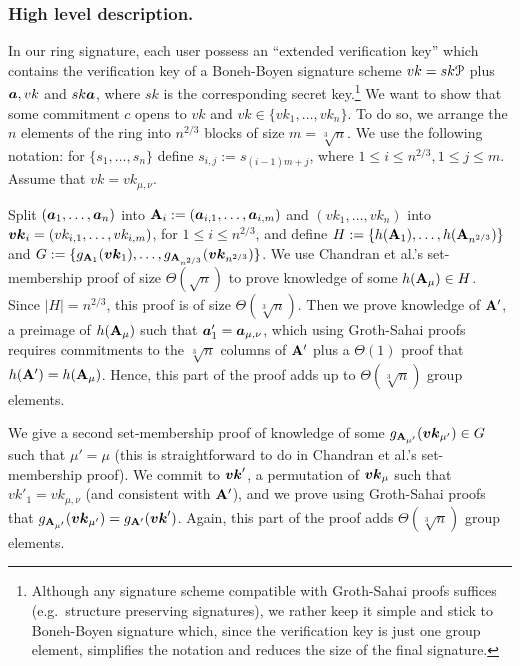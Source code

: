 \subsubsection{High level description.}
In our ring signature, each user possess an ``extended verification key'' which contains the verification key of a Boneh-Boyen signature scheme $vk = sk\mathcal{P}$ plus  ${\boldsymbol{a}},vk$ and $sk{\boldsymbol{a}}$, where $sk$ is the corresponding secret key.\footnote{Although any signature scheme compatible with Groth-Sahai proofs suffices (e.g.~structure preserving signatures), we rather keep it simple and stick to Boneh-Boyen signature which, since the verification key is just one group element, simplifies the notation and reduces the size of the final signature.} We want to show that some commitment $c$ opens to $vk$ and $vk\in\{vk_1,\ldots,vk_n\}$. To do so, we arrange the $n$ elements of the ring into $n^{2/3}$ blocks of size $m=\sqrt[3]{n}$. We use the following notation: for $\{s_1,\ldots, s_n\}$ define $s_{i,j}:=s_{(i-1)m+j}$, where  $1\leq i \leq n^{2/3},1\leq  j \leq m$. Assume that $vk = vk_{\mu,\nu}$.

Split $({\boldsymbol{a}}_{1},\ldots, {\boldsymbol{a}}_{n})$ into $\mathbf{{A}}_i := ({\boldsymbol{a}}_{i,1},\ldots,{\boldsymbol{a}}_{i,m})$ and $(vk_1,\ldots,vk_n)$ into ${\boldsymbol{vk}}_i = (vk_{i,1},\ldots,vk_{i,m})$,  for $1\leq i\leq n^{2/3}$, and define $H\allowbreak:=\{h(\mathbf{{A}}_1),\allowbreak\ldots,\allowbreak h(\mathbf{{A}}_{n^{2/3}})\}$ and $G := \{g_{\mathbf{{A}}_1}({\boldsymbol{vk}}_1),\ldots,g_{\mathbf{{A}}_{n^{2/3}}}({\boldsymbol{vk}}_{n^{2/3}})\}$.  
We use Chandran et al.'s set-membership proof of size $\Theta(\sqrt{n})$ to prove knowledge of some $h(\mathbf{{A}}_\mu)\in H$. Since $|H|=n^{2/3}$, this proof is of size $\Theta(\sqrt[3]{n})$. Then we prove knowledge of $\mathbf{{A}}'$, a preimage of $h(\mathbf{{A}}_\mu)$ such that ${\boldsymbol{a}}'_1 = {\boldsymbol{a}}_{\mu,\nu}$, which using Groth-Sahai proofs requires commitments to the $\sqrt[3]{n}$ columns of $\mathbf{{A}}'$ plus a $\Theta(1)$ proof that $h(\mathbf{{A}}')=h(\mathbf{{A}}_\mu)$. Hence, this part of the proof adds up to $\Theta(\sqrt[3]{n})$ group elements.

We give a second set-membership proof of knowledge of some
$g_{\mathbf{{A}}_{\mu'}}({\boldsymbol{vk}}_{\mu'})\in G$ such that $\mu'=\mu$ (this is straightforward to do in Chandran et al.'s set-membership proof).
We commit to ${\boldsymbol{vk}}'$, a permutation of ${\boldsymbol{vk}}_\mu$ such that $vk'_1=vk_{\mu,\nu}$ (and consistent with $\mathbf{{A}}'$), and we prove using Groth-Sahai proofs that $g_{\mathbf{{A}}_{\mu'}}({\boldsymbol{vk}}_{\mu'}) = g_{\mathbf{{A}}'}({\boldsymbol{vk}}')$. Again, this part of the proof adds $\Theta(\sqrt[3]{n})$ group elements.

